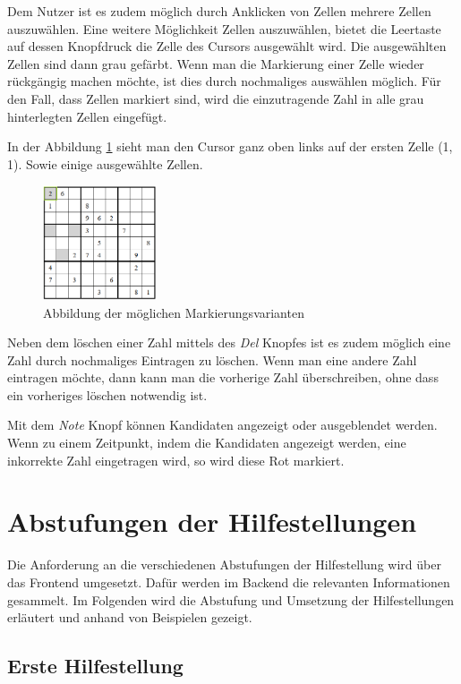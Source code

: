 Dem Nutzer ist es zudem möglich durch Anklicken von Zellen mehrere Zellen auszuwählen. Eine weitere Möglichkeit Zellen auszuwählen, bietet die Leertaste auf dessen Knopfdruck die Zelle des Cursors ausgewählt wird. Die ausgewählten Zellen sind dann grau gefärbt. Wenn man die Markierung einer Zelle wieder rückgängig machen möchte, ist dies durch nochmaliges auswählen möglich. Für den Fall, dass Zellen markiert sind, wird die einzutragende Zahl in alle grau hinterlegten Zellen eingefügt.

In der Abbildung \ref{fig:Markierungen} sieht man den Cursor ganz oben links auf der ersten Zelle (1, 1). Sowie einige ausgewählte Zellen.

\begin{figure}[htbp]
	\centering
	\includegraphics[width=0.3\textwidth]{images/Markierungen.png}
	\caption{Abbildung der möglichen Markierungsvarianten}
	\label{fig:Markierungen}
\end{figure}

Neben dem löschen einer Zahl mittels des \textit{Del} Knopfes ist es zudem möglich eine Zahl durch nochmaliges Eintragen zu löschen. Wenn man eine andere Zahl eintragen möchte, dann kann man die vorherige Zahl überschreiben, ohne dass ein vorheriges löschen notwendig ist. 

Mit dem \textit{Note} Knopf können Kandidaten angezeigt oder ausgeblendet werden. Wenn zu einem Zeitpunkt, indem die Kandidaten angezeigt werden, eine inkorrekte Zahl eingetragen wird, so wird diese Rot markiert.


\section{Abstufungen der Hilfestellungen}\label{Abstufung}
Die Anforderung an die verschiedenen Abstufungen der Hilfestellung wird über das Frontend umgesetzt. Dafür werden im Backend die relevanten Informationen gesammelt. Im Folgenden wird die Abstufung und Umsetzung der Hilfestellungen erläutert und anhand von Beispielen gezeigt.

\subsection{Erste Hilfestellung}

